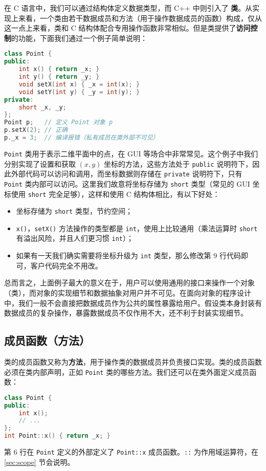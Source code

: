 \documentclass[hyperref,UTF8]{article}
\begin{document}
在 C 语言中，我们可以通过结构体定义数据类型，而 C++ 中则引入了 \textbf{类}。从实现上来看，一个类由若干数据成员和方法（用于操作数据成员的函数）构成，仅从这一点上来看，类和 C 结构体配合专用操作函数非常相似。但是类提供了\textbf{访问控制}的功能，下面我们通过一个例子简单说明：
\begin{lstlisting}[language=c++]
class Point {
public:
    int x() { return _x; }
    int y() { return _y; }
    void setX(int x) { _x = int(x); }
    void setY(int y) { _y = int(y); }
private:
    short _x, _y;
};
Point p;   // 定义 Point 对象 p
p.setX(2); // 正确
p._x = 3;  // 编译报错（私有成员在类外部不可见）
\end{lstlisting}
\texttt{Point} 类用于表示二维平面中的点，在 GUI 等场合中非常常见。这个例子中我们分别实现了设置和获取 $(x, y)$ 坐标的方法，这些方法处于 \texttt{public} 说明符下，因此外部代码可以访问和调用，而坐标数据则存储在 \texttt{private} 说明符下，只有 \texttt{Point} 类内部可以访问。这里我们故意将坐标存储为 \texttt{short} 类型（常见的 GUI 坐标使用 \texttt{short} 完全足够），这样和使用 C 结构体相比，有以下好处：
\begin{itemize}
  \item 坐标存储为 \texttt{short} 类型，节约空间；
  \item \texttt{x()}，\texttt{setX()} 方法操作的类型都是 \texttt{int}，使用上比较通用（乘法运算时 \texttt{short} 有溢出风险，并且人们更习惯 \texttt{int}）；
  \item 如果有一天我们确实需要将坐标升级为 \texttt{int} 类型，那么修改第 9 行代码即可，客户代码完全不用改。
\end{itemize}
总而言之，上面例子最大的意义在于，用户可以使用通用的接口来操作一个对象（类），而对象的实现细节和数据抽象对用户并不可见。在面向对象的程序设计中，我们一般不会直接把数据成员作为公共的属性暴露给用户。假设类本身封装有数据成员的复杂操作，暴露数据成员不仅作用不大，还不利于封装实现细节。

\subsection{成员函数（方法）}

类的成员函数又称为\textbf{方法}，用于操作类的数据成员并负责接口实现。类的成员函数必须在类内部声明，正如 \texttt{Point} 类的哪些方法。我们还可以在类外面定义成员函数：
\begin{lstlisting}[language=c++]
class Point {
public:
    int x();
    // ...
};
int Point::x() { return _x; }
\end{lstlisting}
第 6 行在 \texttt{Point} 定义的外部定义了 \texttt{Point::x} 成员函数。\texttt{::} 为作用域运算符，在 \ref{sec:scope} 节会说明。
\end{document}
